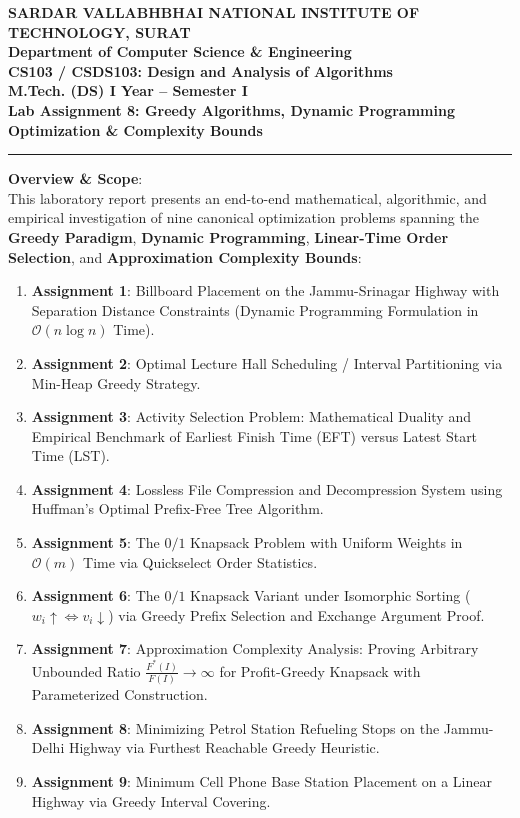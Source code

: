 \documentclass[12pt]{article}
\begin{document}
\begin{center}
\textbf{\Large SARDAR VALLABHBHAI NATIONAL INSTITUTE OF TECHNOLOGY, SURAT}\\[4pt]
\textbf{\large Department of Computer Science \& Engineering}\\[3pt]
\textbf{\large CS103 / CSDS103: Design and Analysis of Algorithms}\\[3pt]
\textbf{\large M.Tech. (DS) I Year -- Semester I}\\[4pt]
\textbf{\Large Lab Assignment 8: Greedy Algorithms, Dynamic Programming Optimization \& Complexity Bounds}
\end{center}

\vspace{0.2cm}
\hrule
\vspace{0.4cm}

\textbf{Overview \& Scope}:\\
This laboratory report presents an end-to-end mathematical, algorithmic, and empirical investigation of nine canonical optimization problems spanning the \textbf{Greedy Paradigm}, \textbf{Dynamic Programming}, \textbf{Linear-Time Order Selection}, and \textbf{Approximation Complexity Bounds}:
\begin{enumerate}
    \item \textbf{Assignment 1}: Billboard Placement on the Jammu-Srinagar Highway with Separation Distance Constraints (Dynamic Programming Formulation in $\mathcal{O}(n \log n)$ Time).
    \item \textbf{Assignment 2}: Optimal Lecture Hall Scheduling / Interval Partitioning via Min-Heap Greedy Strategy.
    \item \textbf{Assignment 3}: Activity Selection Problem: Mathematical Duality and Empirical Benchmark of Earliest Finish Time (EFT) versus Latest Start Time (LST).
    \item \textbf{Assignment 4}: Lossless File Compression and Decompression System using Huffman's Optimal Prefix-Free Tree Algorithm.
    \item \textbf{Assignment 5}: The $0/1$ Knapsack Problem with Uniform Weights in $\mathcal{O}(m)$ Time via Quickselect Order Statistics.
    \item \textbf{Assignment 6}: The $0/1$ Knapsack Variant under Isomorphic Sorting ($w_i \uparrow \iff v_i \downarrow$) via Greedy Prefix Selection and Exchange Argument Proof.
    \item \textbf{Assignment 7}: Approximation Complexity Analysis: Proving Arbitrary Unbounded Ratio $\frac{F^*(I)}{F(I)} \to \infty$ for Profit-Greedy Knapsack with Parameterized Construction.
    \item \textbf{Assignment 8}: Minimizing Petrol Station Refueling Stops on the Jammu-Delhi Highway via Furthest Reachable Greedy Heuristic.
    \item \textbf{Assignment 9}: Minimum Cell Phone Base Station Placement on a Linear Highway via Greedy Interval Covering.
\end{enumerate}
\end{document}
